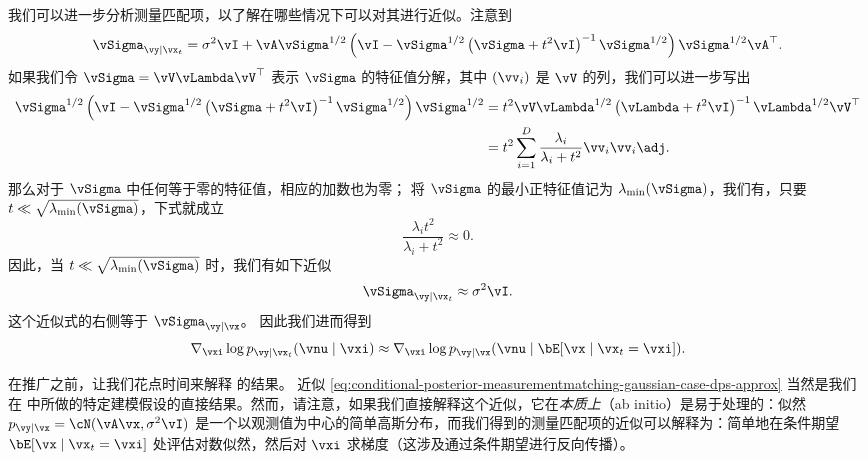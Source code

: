 \documentclass[../../book-main_zh.tex]{subfiles}
\begin{document}
\begin{example}
    我们可以进一步分析测量匹配项，以了解在哪些情况下可以对其进行近似。注意到
    \begin{equation}
        \vSigma_{\vy \mid \vx_t}
        =
        \sigma^2 \vI + \vA\vSigma^{1/2} \left(
            \vI - \vSigma^{1/2}\left(
                \vSigma + t^2 \vI
            \right)^{-1}
            \vSigma^{1/2}
        \right)\vSigma^{1/2}\vA^\top.
    \end{equation}
    如果我们令 $\vSigma = \vV \vLambda \vV^\top$ 表示 $\vSigma$ 的特征值分解，其中 $(\vv_i)$ 是 $\vV$ 的列，我们可以进一步写出
    \begin{align}
        \vSigma^{1/2}\left(
            \vI - \vSigma^{1/2}\left(
                \vSigma + t^2 \vI
            \right)^{-1}
            \vSigma^{1/2}
        \right) \vSigma^{1/2}
        &=
        t^2 \vV \vLambda^{1/2}\left(
            \vLambda + t^2 \vI
        \right)^{-1}
        \vLambda^{1/2}
        \vV^\top
        \\
        &=
        t^2 \sum_{i=1}^D
        \frac{\lambda_i}{\lambda_i + t^2}
        \vv_i \vv_i\adj.
    \end{align}
    那么对于 $\vSigma$ 中任何等于零的特征值，相应的加数也为零；
    将 $\vSigma$ 的最小正特征值记为 $\lambda_{\min}(\vSigma)$，我们有，只要 $t \ll
    \sqrt{\lambda_{\min}(\vSigma)}$，下式就成立
    \begin{equation}
        \frac{\lambda_i t^2}{\lambda_i + t^2} \approx 0.
    \end{equation}
    因此，当 $t \ll \sqrt{\lambda_{\min}(\vSigma)}$ 时，我们有如下近似
    \begin{equation}
        \vSigma_{\vy \mid \vx_t} \approx \sigma^2 \vI.
    \end{equation}
    这个近似式的右侧等于
    $\vSigma_{\vy \mid \vx}$。
    因此我们进而得到
    \begin{equation}
        \nabla_{\vxi} \log p_{\vy \mid \vx_t}(\vnu \mid \vxi)
        \approx
        \nabla_{\vxi} \log p_{\vy \mid \vx}(\vnu \mid \bE[\vx \mid
        \vx_t = \vxi]).
        \label{eq:conditional-posterior-measurementmatching-gaussian-case-dps-approx}
    \end{equation}

\end{example}

在推广之前，让我们花点时间来解释
 的结果。
近似
\eqref{eq:conditional-posterior-measurementmatching-gaussian-case-dps-approx}
当然是我们在  中所做的特定建模假设的直接结果。然而，请注意，如果我们直接解释这个近似，它在\textit{本质上}（ab initio）是易于处理的：似然 $p_{\vy \mid \vx} = \cN(\vA\vx, \sigma^2 \vI)$ 是一个以观测值为中心的简单高斯分布，而我们得到的测量匹配项的近似可以解释为：简单地在条件期望 $\bE[\vx \mid \vx_t = \vxi]$ 处评估对数似然，然后对 $\vxi$ 求梯度（这涉及通过条件期望进行反向传播）。
\end{document}
